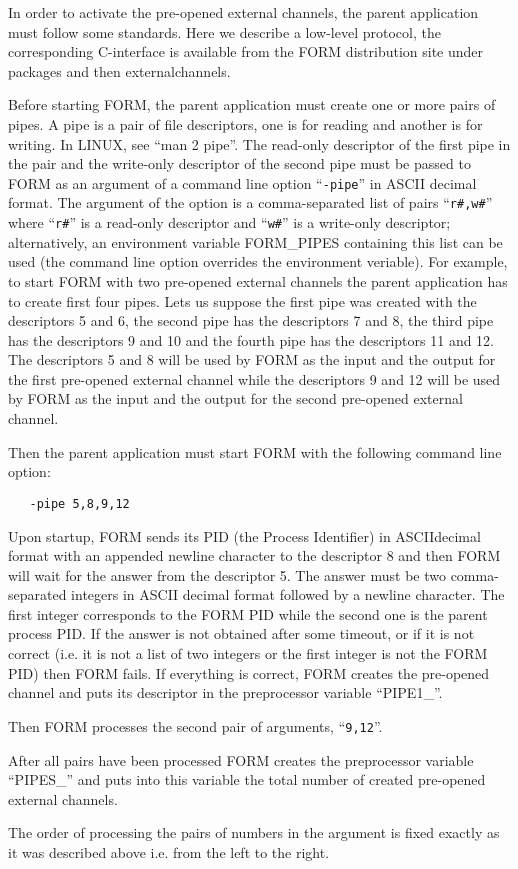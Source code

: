 In order to activate the pre-opened external channels, the parent
application must follow some standards. Here we describe a low-level 
protocol, the corresponding 
C-interface is available from the FORM distribution site 
under packages and then externalchannels.

Before starting FORM, the parent application must create one or more pairs 
of pipes. A pipe is a pair of file descriptors, one is for 
reading and another is for writing. In LINUX, see ``man 2 
pipe''. The read-only descriptor of the first pipe in the pair and the 
write-only descriptor of the second pipe must be passed to FORM as an 
argument of a command line option ``\verb|-pipe|'' in ASCII decimal format. 
The argument of the option is a comma-separated list of pairs
``\verb|r#,w#|'' where ``\verb|r#|'' is a read-only descriptor and 
``\verb|w#|'' is a write-only descriptor; alternatively, an environment 
variable FORM\_PIPES containing this list can be used 
(the command line option overrides the environment veriable). For example, 
to start FORM with two pre-opened external channels the parent application 
has to create first four pipes. Lets us suppose the first pipe was created 
with the descriptors 5 and 6, the second pipe has the descriptors 7 and 8, 
the third pipe has the descriptors 9 and 10 and the fourth pipe has the 
descriptors 11 and 12. The descriptors 5 and 8 will be used by FORM as the 
input and the output for the first pre-opened external channel while the 
descriptors 9 and 12 will be used by FORM as the input and the output for 
the second pre-opened external channel.

Then the parent application must start FORM with the following 
command line option:
\begin{verbatim}
   -pipe 5,8,9,12
\end{verbatim}

Upon startup, FORM sends its PID (the Process Identifier) in 
ASCIIdecimal format with an appended newline character to the descriptor 8 
and then FORM will wait for the answer from the descriptor 5. The answer 
must be two comma-separated integers in ASCII decimal format followed by a 
newline character. The first integer corresponds to the FORM PID while the 
second one is the parent process PID. If the answer is not obtained after 
some timeout, or if it is not correct (i.e. it is not a list of two 
integers or the first integer is not the FORM PID) then FORM fails. If 
everything is correct, FORM creates the pre-opened channel and puts its 
descriptor in the preprocessor variable ``PIPE1\_''.

Then FORM processes the second pair of arguments, ``\verb|9,12|''.

After all pairs have been processed FORM creates the preprocessor variable 
``PIPES\_'' and puts into this variable the total number of created 
pre-opened external channels.

The order of processing the pairs of numbers in the argument is fixed 
exactly as it was described above i.e. from the left to the right.


